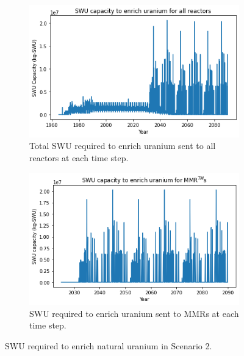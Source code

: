 \documentclass[preprint]{elsarticle}
\providecommand{\DIFaddbeginFL}{} %
\providecommand{\DIFaddendFL}{} %
\providecommand{\DIFdelbeginFL}{} %
\providecommand{\DIFdelendFL}{} %
\begin{document}
\begin{figure}
    \centering
    \DIFdelbeginFL %
\DIFdelendFL \DIFaddbeginFL \begin{subfigure}{0.45\textwidth}
        \DIFaddendFL \centering
        \DIFdelbeginFL %
\DIFdelendFL \DIFaddbeginFL \includegraphics[scale=0.4]{../figures/totalswu_scenarios_2.png}
        \DIFaddendFL \caption{Total \gls{SWU} required to enrich uranium sent to all reactors at each time step.}
        \label{fig:totalswu_2}
    \end{subfigure}
    \hspace{0.8cm}
    \DIFdelbeginFL %
\DIFdelendFL \DIFaddbeginFL \begin{subfigure}{0.45\textwidth}
        \DIFaddendFL \centering
        \DIFdelbeginFL %
\DIFdelendFL \DIFaddbeginFL \includegraphics[scale=0.4]{../figures/haleuSWU_scenarios_2.png}
        \DIFaddendFL \caption{\gls{SWU} required to enrich uranium sent to \glspl{MMR} at each time step.}
        \label{fig:haleuswu_2}
    \end{subfigure}
    \caption{\gls{SWU} required to enrich natural uranium in Scenario 2.}
    \label{fig:swu_2}
\end{figure}
\end{document}
